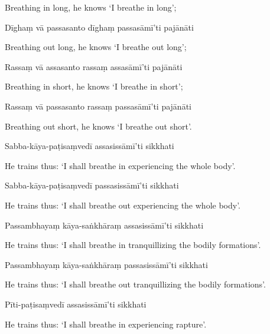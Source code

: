 \begin{english}
  Breathing in long, he knows `I breathe in long';
\end{english}

Dīghaṃ vā passasanto dīghaṃ passasāmī'ti pajānāti

\begin{english}
  Breathing out long, he knows `I breathe out long';
\end{english}

Rassaṃ vā assasanto rassaṃ assasāmī'ti pajānāti

\begin{english}
  Breathing in short, he knows `I breathe in short';
\end{english}

Rassaṃ vā passasanto rassaṃ passasāmī'ti pajānāti

\begin{english}
  Breathing out short, he knows `I breathe out short'.
\end{english}

Sabba-kāya-paṭisaṃvedī assasissāmī'ti sikkhati

\begin{english}
  He trains thus: `I shall breathe in experiencing the whole body'.
\end{english}

Sabba-kāya-paṭisaṃvedī passasissāmī'ti sikkhati

\begin{english}
  He trains thus: `I shall breathe out experiencing the whole body'.
\end{english}

Passambhayaṃ kāya-saṅkhāraṃ assasissāmī'ti sikkhati

\begin{english}
  He trains thus: `I shall breathe in tranquillizing the bodily formations'.
\end{english}

Passambhayaṃ kāya-saṅkhāraṃ passasissāmī'ti sikkhati

\begin{english}
  He trains thus: `I shall breathe out tranquillizing the bodily formations'.
\end{english}

Pīti-paṭisaṃvedī assasissāmī'ti sikkhati

\begin{english}
  He trains thus: `I shall breathe in experiencing rapture'.
\end{english}

